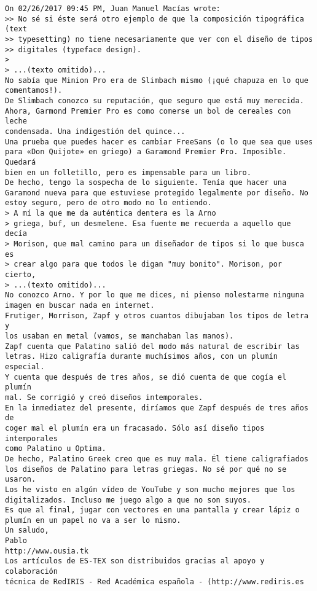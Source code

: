 \documentclass[a4paper,10pt]{article}
\begin{document}
\begin{lstlisting}
On 02/26/2017 09:45 PM, Juan Manuel Macías wrote:
>> No sé si éste será otro ejemplo de que la composición tipográfica (text
>> typesetting) no tiene necesariamente que ver con el diseño de tipos
>> digitales (typeface design).
> 
> ...(texto omitido)...
No sabía que Minion Pro era de Slimbach mismo (¡qué chapuza en lo que
comentamos!).
De Slimbach conozco su reputación, que seguro que está muy merecida.
Ahora, Garmond Premier Pro es como comerse un bol de cereales con leche
condensada. Una indigestión del quince...
Una prueba que puedes hacer es cambiar FreeSans (o lo que sea que uses
para «Don Quijote» en griego) a Garamond Premier Pro. Imposible. Quedará
bien en un folletillo, pero es impensable para un libro.
De hecho, tengo la sospecha de lo siguiente. Tenía que hacer una
Garamond nueva para que estuviese protegido legalmente por diseño. No
estoy seguro, pero de otro modo no lo entiendo.
> A mí la que me da auténtica dentera es la Arno
> griega, buf, un desmelene. Esa fuente me recuerda a aquello que decía
> Morison, que mal camino para un diseñador de tipos si lo que busca es
> crear algo para que todos le digan "muy bonito". Morison, por cierto,
> ...(texto omitido)...
No conozco Arno. Y por lo que me dices, ni pienso molestarme ninguna
imagen en buscar nada en internet.
Frutiger, Morrison, Zapf y otros cuantos dibujaban los tipos de letra y
los usaban en metal (vamos, se manchaban las manos).
Zapf cuenta que Palatino salió del modo más natural de escribir las
letras. Hizo caligrafía durante muchísimos años, con un plumín especial.
Y cuenta que después de tres años, se dió cuenta de que cogía el plumín
mal. Se corrigió y creó diseños intemporales.
En la inmediatez del presente, diríamos que Zapf después de tres años de
coger mal el plumín era un fracasado. Sólo así diseño tipos intemporales
como Palatino u Optima.
De hecho, Palatino Greek creo que es muy mala. Él tiene caligrafiados
los diseños de Palatino para letras griegas. No sé por qué no se usaron.
Los he visto en algún vídeo de YouTube y son mucho mejores que los
digitalizados. Incluso me juego algo a que no son suyos.
Es que al final, jugar con vectores en una pantalla y crear lápiz o
plumín en un papel no va a ser lo mismo.
Un saludo,
Pablo
http://www.ousia.tk
Los artículos de ES-TEX son distribuidos gracias al apoyo y colaboración 
técnica de RedIRIS - Red Académica española - (http://www.rediris.es

\end{lstlisting}
\end{document}
